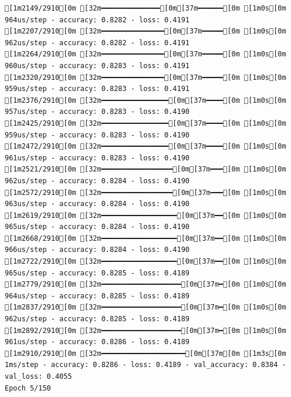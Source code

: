 \documentclass[
  letterpaper,
  DIV=11,
  numbers=noendperiod]{scrartcl}
\begin{document}
\begin{verbatim}
[1m2149/2910[0m [32m━━━━━━━━━━━━━━[0m[37m━━━━━━[0m [1m0s[0m 964us/step - accuracy: 0.8282 - loss: 0.4191
[1m2207/2910[0m [32m━━━━━━━━━━━━━━━[0m[37m━━━━━[0m [1m0s[0m 962us/step - accuracy: 0.8282 - loss: 0.4191
[1m2264/2910[0m [32m━━━━━━━━━━━━━━━[0m[37m━━━━━[0m [1m0s[0m 960us/step - accuracy: 0.8283 - loss: 0.4191
[1m2320/2910[0m [32m━━━━━━━━━━━━━━━[0m[37m━━━━━[0m [1m0s[0m 959us/step - accuracy: 0.8283 - loss: 0.4191
[1m2376/2910[0m [32m━━━━━━━━━━━━━━━━[0m[37m━━━━[0m [1m0s[0m 957us/step - accuracy: 0.8283 - loss: 0.4190
[1m2425/2910[0m [32m━━━━━━━━━━━━━━━━[0m[37m━━━━[0m [1m0s[0m 959us/step - accuracy: 0.8283 - loss: 0.4190
[1m2472/2910[0m [32m━━━━━━━━━━━━━━━━[0m[37m━━━━[0m [1m0s[0m 961us/step - accuracy: 0.8283 - loss: 0.4190
[1m2521/2910[0m [32m━━━━━━━━━━━━━━━━━[0m[37m━━━[0m [1m0s[0m 962us/step - accuracy: 0.8284 - loss: 0.4190
[1m2572/2910[0m [32m━━━━━━━━━━━━━━━━━[0m[37m━━━[0m [1m0s[0m 963us/step - accuracy: 0.8284 - loss: 0.4190
[1m2619/2910[0m [32m━━━━━━━━━━━━━━━━━━[0m[37m━━[0m [1m0s[0m 965us/step - accuracy: 0.8284 - loss: 0.4190
[1m2668/2910[0m [32m━━━━━━━━━━━━━━━━━━[0m[37m━━[0m [1m0s[0m 966us/step - accuracy: 0.8284 - loss: 0.4190
[1m2722/2910[0m [32m━━━━━━━━━━━━━━━━━━[0m[37m━━[0m [1m0s[0m 965us/step - accuracy: 0.8285 - loss: 0.4189
[1m2779/2910[0m [32m━━━━━━━━━━━━━━━━━━━[0m[37m━[0m [1m0s[0m 964us/step - accuracy: 0.8285 - loss: 0.4189
[1m2837/2910[0m [32m━━━━━━━━━━━━━━━━━━━[0m[37m━[0m [1m0s[0m 962us/step - accuracy: 0.8285 - loss: 0.4189
[1m2892/2910[0m [32m━━━━━━━━━━━━━━━━━━━[0m[37m━[0m [1m0s[0m 961us/step - accuracy: 0.8286 - loss: 0.4189
[1m2910/2910[0m [32m━━━━━━━━━━━━━━━━━━━━[0m[37m[0m [1m3s[0m 1ms/step - accuracy: 0.8286 - loss: 0.4189 - val_accuracy: 0.8384 - val_loss: 0.4055
Epoch 5/150


\end{verbatim}
\end{document}
